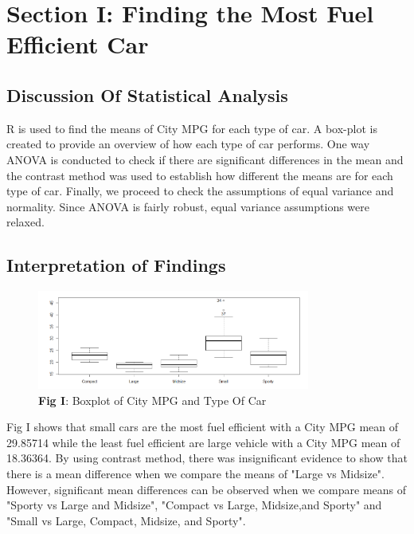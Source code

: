\documentclass[12pt]{article}
\begin{document}
\section{Section I: Finding the Most Fuel Efficient Car}
\subsection{Discussion Of Statistical Analysis}
R is used to find the means of City MPG for each type of car. A box-plot is created to provide an overview of how each type of car performs. One way ANOVA is conducted to check if there are significant differences in the mean and the contrast method was used to establish how different the means are for each type of car. Finally, we proceed to check the assumptions of equal variance and normality. Since ANOVA is fairly robust, equal variance assumptions were relaxed.

\subsection{Interpretation of Findings}
\begin{figure}[!htb]
	\caption*{\textbf{Fig I}: Boxplot of City MPG and Type Of Car}
	\begin{center}
	\includegraphics[width=0.80\textwidth]{Boxplot.png}
	\end{center}
\end{figure}

Fig I shows that small cars are the most fuel efficient with a City MPG mean of 29.85714 while the least fuel efficient are large vehicle with a City MPG mean of 18.36364. By using contrast method, there was insignificant evidence to show that there is a mean difference when we compare the means of "Large vs Midsize". However, significant mean differences can be observed when we compare means of "Sporty vs Large and Midsize", "Compact vs Large, Midsize,and Sporty" and "Small vs Large, Compact, Midsize, and Sporty".
\end{document}
